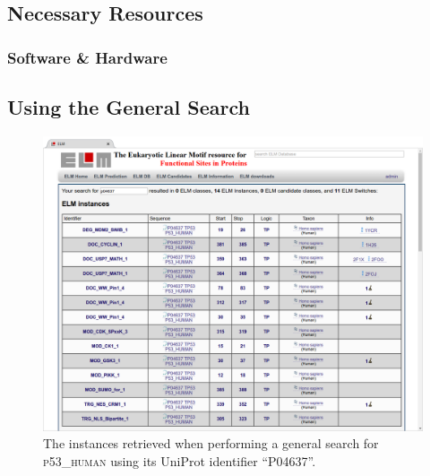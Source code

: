 \documentclass[12pt]{article}
\newcommand\uniprot[1]{%
	\textsc{\lowercase{#1}}%
}
\begin{document}
	\subsection*{Necessary Resources}
	\subsubsection*{Software \& Hardware}
	

	\subsection*{Using the General Search}
	\label{subsec:general_search_using}
	

	\begin{enumerate}

	\begin{figure}[h!]
		\centering
		\includegraphics[width=\textwidth]{Figures/general_search/P04637_instances.png}
		\caption{
			The instances retrieved when performing a general search for
			\uniprot{P53\_HUMAN} using its UniProt identifier ``P04637''.
		}
		\label{fig:general_search_P04637_instances}
	\end{figure}


\end{enumerate}
\end{document}
